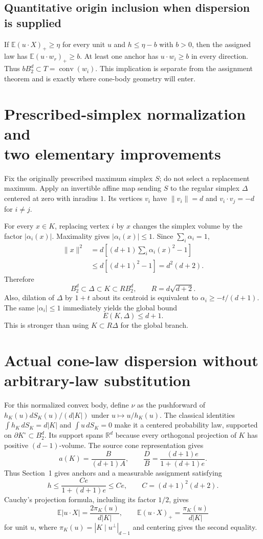\documentclass[11pt,letterpaper]{article}
\newcommand{\EE}{\mathbb E}
\newcommand{\RR}{\mathbb R}
\newcommand{\BB}{B_2^d}
\newcommand{\conv}{\operatorname{conv}}
\newcommand{\pos}[1]{(#1)_+}
\begin{document}
\subsection*{Quantitative origin inclusion when dispersion is supplied}
If $\EE\pos{u\cdot X}\ge\eta$ for every unit $u$ and $h\le\eta-b$ with
$b>0$, then the assigned law has $\EE\pos{u\cdot w_r}\ge b$. At least one
anchor has $u\cdot w_i\ge b$ in every direction. Thus
$b\BB\subset T=\conv(w_i)$. This implication is separate from the
assignment theorem and is exactly where cone-body geometry will enter.

\section[Prescribed-simplex normalization and two elementary improvements]{Prescribed-simplex normalization and\\two elementary improvements}
Fix the originally prescribed maximum simplex $S$; do not select a
replacement maximum. Apply an invertible affine map sending $S$ to the
regular simplex $\Delta$ centered at zero with inradius $1$. Its vertices
$v_i$ have $\|v_i\|=d$ and $v_i\cdot v_j=-d$ for $i\ne j$.

For every $x\in K$, replacing vertex $i$ by $x$ changes the simplex volume
by the factor $|\alpha_i(x)|$. Maximality gives $|\alpha_i(x)|\le1$. Since
$\sum_i\alpha_i=1$,
\begin{align*}
 \|x\|^2&=d\left[(d+1)\sum_i\alpha_i(x)^2-1\right]\\
 &\le d[(d+1)^2-1]=d^2(d+2).
\end{align*}
Therefore
\[
 \BB\subset\Delta\subset K\subset R\BB,\qquad R=d\sqrt{d+2}.
\]
Also, dilation of $\Delta$ by $1+t$ about its centroid is equivalent to
$\alpha_i\ge-t/(d+1)$. The same $|\alpha_i|\le1$ immediately yields the
global bound
\[
 E(K,\Delta)\le d+1.
\]
This is stronger than using $K\subset R\Delta$ for the global branch.

\section{Actual cone-law dispersion without arbitrary-law substitution}
For this normalized convex body, define $\nu$ as the pushforward of
$h_K(u)dS_K(u)/(d|K|)$ under $u\mapsto u/h_K(u)$. The classical identities
$\int h_K\,dS_K=d|K|$ and $\int u\,dS_K=0$ make it a centered probability
law, supported on $\partial K^\circ\subset\BB$. Its support spans $\RR^d$
because every orthogonal projection of $K$ has positive $(d-1)$-volume.
The source cone representation \cite[Proposition~4.1]{entry} gives
\[
 a(K)=\frac{B}{(d+1)A},\qquad
 \frac DB=\frac{(d+1)e}{1+(d+1)e}.
\]
Thus Section~1 gives anchors and a measurable assignment satisfying
\[
 h\le\frac{Ce}{1+(d+1)e}\le Ce,\qquad C=(d+1)^2(d+2).
\]
Cauchy's projection formula, including its factor $1/2$, gives
\[
 \EE|u\cdot X|=\frac{2\pi_K(u)}{d|K|},\qquad
 \EE\pos{u\cdot X}=\frac{\pi_K(u)}{d|K|}
\]
for unit $u$, where $\pi_K(u)=|K\mid u^\perp|_{d-1}$ and centering gives
the second equality.
\end{document}

